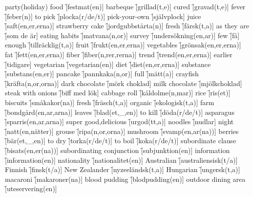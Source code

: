 \begin{questions}
\begin{multicols}{2}
        \question party(holiday) food \f[festmat(en)]
        \question barbeque \f[grillad(t,e)]
        \question cured \f[gravad(t,e)]
        \question fever \f[feber(n)]
        \question to pick \f[plocka(r/de/t)]
        \question pick-your-own \f[självplock]
        \question juice \f[saft(en,er,erna)]
        \question strawberry cake \f[jordgubbstårta(n)]
        \question fresh \f[färsk(t,a)]
        \question as they are \f[som de är]
        \question eating habits \f[matvana(n,or)]
        \question survey \f[undersökning(en,ar)]
        \question few \f[få]
        \question enough \f[tillräcklig(t,a)]
        \question fruit \f[frukt(en,er,erna)]
        \question vegetables \f[grönsak(en,er,erna)]
        \question fat \f[fett(en,er,erna)]
        \question fiber \f[fiber(n,rer,rerna)]
        \question trend \f[trend(en,er,erna)]
        \question earlier \f[tidigare]
        \question vegetarian \f[vegetarian(en)]
        \question diet \f[diet(en,er,erna)]
        \question substance \f[substans(en,er)]
        \question pancake \f[pannkaka(n,or)]
        \question full \f[mätt(a)]
        \question crayfish \f[kräfta(n,or,orna)]
        \question dark chocolate \f[mörk choklad]
        \question milk chocolate \f[mjölkchoklad]
        \question steak with onions \f[biff med lök]
        \question cabbage roll \f[kåldolme(n,mar)]
        \question rice \f[ris(et)]
        \question biscuits \f[småkakor(na)]
        \question fresh \f[fräsch(t,a)]
        \question organic \f[ekologisk(t,a)]
        \question farm \f[bondgård(en,ar,arna)]
        \question leaves \f[blad(et,\_,en)]
        \question to kill \f[döda(r/de/t)]
        \question asparagus \f[sparris(en,ar,arna)]
        \question super good,delicious \f[urgod(tt,a)]
        \question noodles \f[nudlar]
        \question night \f[natt(en,nätter)]
        \question grouse \f[ripa(n,or,orna)]
        \question mushroom \f[svamp(en,ar(na))]
        \question berries \f[bär(et,\_,en)]
        \question to dry \f[torka(r/de/t)]
        \question to boil \f[koka(r/de/t)]
        \question subordinate clause \f[bisats(en,er(na))]
        \question subordinating conjunction \f[subjunktion(en)]
        \question information \f[information(en)]
        \question nationality \f[nationalitet(en)]
        \question Australian \f[australiensisk(t/a)]
        \question Finnish \f[finsk(t/a)]
        \question New Zealander \f[nyzeeländsk(t,a)]
        \question Hungarian \f[ungersk(t,a)]
        \question macaroni \f[makaroner(na)]
        \question blood pudding \f[blodpudding(en)]
        \question outdoor dining area \f[uteservering(en)]

\end{multicols}
\end{questions}
